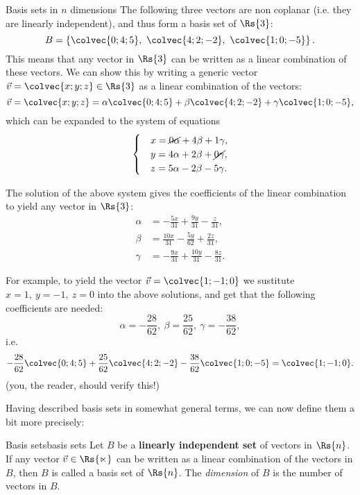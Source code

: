 \begin{example}{Basis sets in $n$ dimensions}{}
	The following three vectors are non coplanar (i.e. they are linearly independent), and thus form a basis set of $\Rs{3}$:
	\[
		B = \left\{ \colvec{0;4;5},\ \colvec{4;2;-2},\ \colvec{1;0;-5} \right\}.
	\]
	This means that any vector in $\Rs{3}$ can be written as a linear combination of these vectors. We can show this by writing a generic vector $\vec{v}=\colvec{x;y;z}\in\Rs{3}$ as a linear combination of the vectors:
	\[
		\vec{v} = \colvec{x;y;z} = \alpha\colvec{0;4;5} + \beta\colvec{4;2;-2} + \gamma\colvec{1;0;-5},
	\]
	which can be expanded to the system of equations
	\[
		\begin{cases}
			& x = \cancel{0\alpha}+4\beta+1\gamma,\\
			& y = 4\alpha+2\beta+\cancel{0\gamma},\\
			& z = 5\alpha-2\beta-5\gamma.
		\end{cases}
	\]

	The solution of the above system gives the coefficients of the linear combination to yield any vector in $\Rs{3}$:
	\begin{align*}
		\alpha &= -\frac{5x}{31} + \frac{9y}{31} - \frac{z}{31},\\
		\beta  &= \frac{10x}{31} - \frac{5y}{62} + \frac{2z}{31},\\
		\gamma &= -\frac{9x}{31} + \frac{10y}{31} - \frac{8z}{31}.
	\end{align*}

	For example, to yield the vector $\vec{v}=\colvec{1;-1;0}$ we sustitute $x=1,\ y=-1,\ z=0$ into the above solutions, and get that the following coefficients are needed:
	\[
		\alpha=-\frac{28}{62},\ \beta=\frac{25}{62},\ \gamma=-\frac{38}{62},
	\]
	i.e.
	\[
		-\frac{28}{62}\colvec{0;4;5} + \frac{25}{62}\colvec{4;2;-2} -\frac{38}{62}\colvec{1;0;-5} = \colvec{1;-1;0}.
	\]
	(you, the reader, should verify this!)
\end{example}

Having described basis sets in somewhat general terms, we can now define them a bit more precisely:

\begin{definition}{Basis sets}{basis sets}
	Let $B$ be a \textbf{linearly independent set} of vectors in $\Rs{n}$. If any vector $\vec{v}\in\mathbb{\Rs{n}}$ can be written as a linear combination of the vectors in $B$, then $B$ is called a basis set of $\Rs{n}$. The \emph{dimension} of $B$ is the number of vectors in $B$.
\end{definition}

